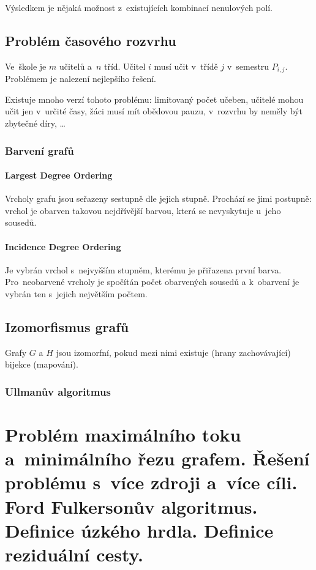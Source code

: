 Výsledkem je nějaká možnost z~existujících kombinací nenulových polí.

\subsection{Problém časového rozvrhu}

Ve~škole je $m$ učitelů a~$n$ tříd.
Učitel $i$ musí učit v~třídě $j$ v~semestru $P_{i,j}$.
Problémem je nalezení nejlepšího řešení.

Existuje mnoho verzí tohoto problému:
limitovaný počet učeben,
učitelé mohou učit jen v~určité časy,
žáci musí mít obědovou pauzu,
v~rozvrhu by neměly být zbytečné díry,
\dots

\subsubsection{Barvení grafů}

\paragraph{Largest Degree Ordering}

Vrcholy grafu jsou seřazeny sestupně dle jejich stupně.
Prochází se jimi postupně: vrchol je obarven takovou nejdřívější barvou, která se nevyskytuje u~jeho sousedů.

\paragraph{Incidence Degree Ordering}

Je vybrán vrchol s~nejvyšším stupněm, kterému je přiřazena první barva.
Pro~neobarvené vrcholy je spočítán počet obarvených sousedů a k~obarvení je vybrán ten s~jejich největším počtem.

\subsection{Izomorfismus grafů}

Grafy $G$ a $H$ jsou izomorfní, pokud mezi nimi existuje (hrany zachovávající) bijekce (mapování).


\subsubsection{Ullmanův algoritmus}

\clearpage
\section{Problém maximálního toku a~minimálního řezu grafem. Řešení problému s~více zdroji a~více cíli. Ford Fulkersonův algoritmus. Definice úzkého hrdla. Definice reziduální cesty.}

